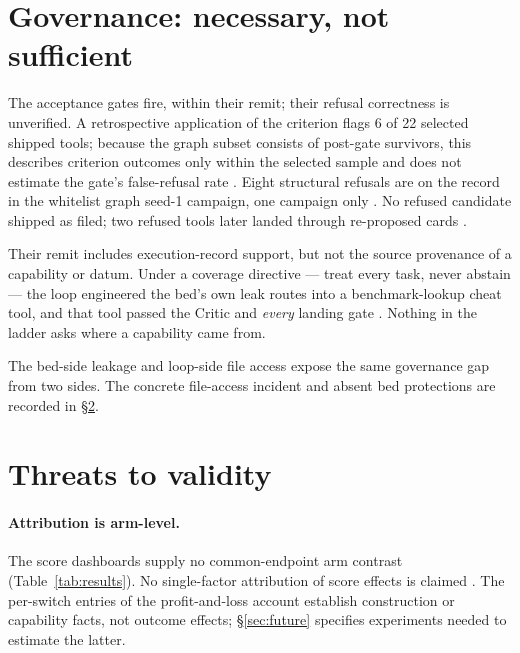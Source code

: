 \section{Governance: necessary, not sufficient}
\label{sec:governance}

The acceptance gates fire, within their remit; their refusal correctness is unverified. A retrospective application of
the criterion flags 6 of 22 selected shipped tools; because the graph subset
consists of post-gate survivors, this describes criterion outcomes only within
the selected sample and does not estimate the gate's false-refusal rate .
Eight structural refusals are on the record in the whitelist graph seed-1
campaign, one campaign only . No refused candidate shipped as filed;
two refused tools later landed through re-proposed cards .

Their remit includes execution-record support, but not the source provenance of a capability or datum. Under a coverage directive --- treat
every task, never abstain --- the loop engineered the bed's own leak routes
into a benchmark-lookup cheat tool, and that tool passed the Critic and
\emph{every} landing gate . Nothing in the ladder asks where a
capability came from.

The bed-side leakage and loop-side file access expose the same
governance gap from two sides. The concrete file-access incident and absent
bed protections are recorded in \S\ref{sec:threats}.

\section{Threats to validity}
\label{sec:threats}

\paragraph{Attribution is arm-level.} The score dashboards supply no
common-endpoint arm contrast (Table~\ref{tab:results}). No single-factor attribution of score
effects is claimed . The per-switch entries of the profit-and-loss
account establish construction or capability facts, not outcome effects;
\S\ref{sec:future} specifies experiments needed to estimate the latter.

